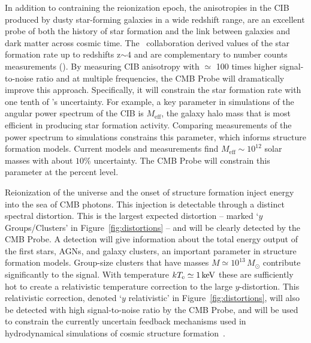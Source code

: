 In addition to contraining the reionization epoch, the anisotropies in the \ac{CIB} produced by dusty star-forming galaxies in a wide redshift range, are
an excellent probe of both the history of star formation and the link between
galaxies and dark matter across cosmic time. The \planck\ collaboration 
derived values of the star formation rate up to redshifts z$\mathrm{\sim 4}$ and are complementary to number counts measurements (\cite{planck2014-XXX,planckXVIII,madau2014}). By measuring \ac{CIB} anisotropy with $\simeq$ 100 times higher signal-to-noise ratio and at multiple frequencies, the CMB Probe will dramatically improve this approach. Specifically, it will constrain the star formation rate with one tenth of \planck 's uncertainty.  For example, a key parameter in simulations of the angular power spectrum of the \ac{CIB} 
is $M_{\mathrm{eff}}$, the galaxy halo mass that is most efficient in producing star 
formation activity. Comparing measurements of the power spectrum to simulations
constrains this parameter, which informs structure formation models. Current models and measurements 
find $M_{\mathrm{eff}}\sim 10^{12}$ solar masses with about $\mathrm{10\%}$ uncertainty. 
The CMB Probe will constrain this parameter at the percent level.



Reionization of the universe and the onset of structure formation inject
energy into the sea of CMB photons. This injection is detectable through a distinct spectral distortion. 
This is the largest expected distortion -- marked `$y$ Groups/Clusters' in Figure~\ref{fig:distortions} --
and will be clearly detected by the CMB Probe. 
A detection will give information about the total energy output of the first stars, AGNs, and galaxy clusters, 
an important parameter in structure formation models. Group-size clusters that have masses $M\simeq 10^{13}\,M_{\odot}$ contribute significantly to the signal.  
With temperature $k T_{\rm e}\simeq 1\,{\rm keV}$ these are sufficiently hot to create a relativistic 
temperature correction to the large $y$-distortion. This relativistic correction, denoted `$y$ relativistic' in 
Figure~\ref{fig:distortions},  will also be detected with high signal-to-noise ratio by the CMB Probe, and 
will be used to constrain the currently uncertain feedback mechanisms used in hydrodynamical simulations
of cosmic structure formation~\citep{Hill2015}. 

